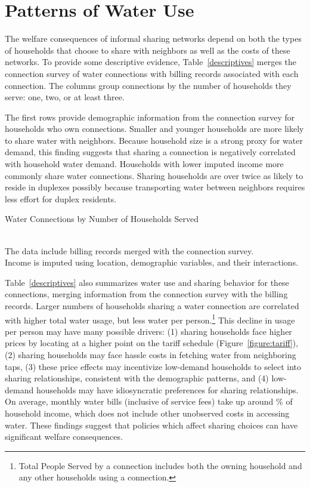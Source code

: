 \documentclass[12pt]{article}
\begin{document}
\section{Patterns of Water Use}\label{section:patternsofwateruse}

The welfare consequences of informal sharing networks depend on both the types of households that choose to share with neighbors as well as the costs of these networks.  To provide some descriptive evidence, Table~\ref{descriptives} merges the connection survey of water connections with billing records associated with each connection.  The columns group connections by the number of households they serve: one, two, or at least three.  

The first rows provide demographic information from the connection survey for households who own connections.  Smaller and younger households are more likely to share water with neighbors.  Because household size is a strong proxy for water demand, this finding suggests that sharing a connection is negatively correlated with household water demand.  Households with lower imputed income more commonly share water connections.  Sharing households are over twice as likely to reside in duplexes possibly because transporting water between neighbors requires less effort for duplex residents.

\begin{table}
\centering
\captionsetup{justification=centering}
\caption{ Water Connections  by Number of Households Served}\label{descriptives}
 \\
\footnotesize{The data include billing records merged with the connection survey. \\ Income is imputed using location, demographic variables, and their interactions.}
\end{table} 

Table~\ref{descriptives} also summarizes water use and sharing behavior for these connections, merging information from the connection survey with the billing records.  Larger numbers of households sharing a water connection are correlated with higher total water usage, but less water per person.\footnote{Total People Served by a connection includes both the owning household and any other households using a connection.}  This decline in usage per person may have many possible drivers: (1) sharing households face higher prices by locating at a higher point on the tariff schedule (Figure~\ref{figure:tariff}), (2) sharing households may face hassle costs in fetching water from neighboring taps, (3) these price effects may incentivize low-demand households to select into sharing relationships, consistent with the demographic patterns, and (4) low-demand households may have idiosyncratic preferences for sharing relationships.  On average, monthly water bills (inclusive of service fees) take up around \unskip\% of household income, which does not include other unobserved costs in accessing water.  These findings suggest that policies which affect sharing choices can have significant welfare consequences.  
\end{document}
